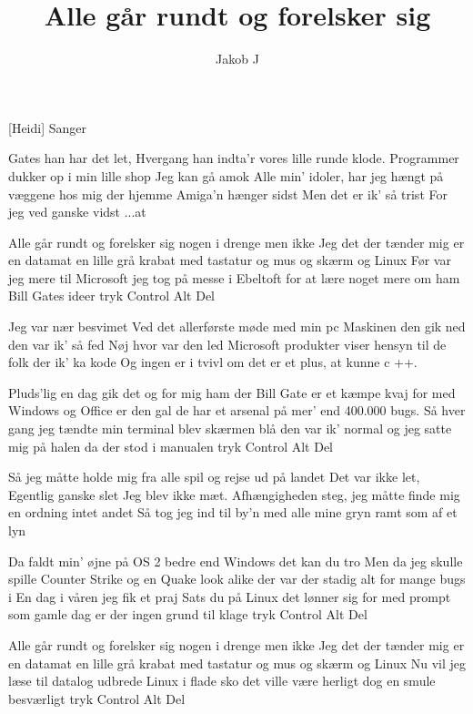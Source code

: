 \documentclass[a4paper,11pt]{article}
\title{Alle går rundt og forelsker sig}
\author{Jakob J}
\begin{document}
\maketitle

\begin{roles}
[Heidi] Sanger
\end{roles}

\begin{props}
\end{props}

\begin{song}
  
 Gates han har det let,
Hvergang han indta'r vores lille runde klode.
Programmer dukker op i min lille shop
Jeg kan gå amok
Alle min' idoler, har jeg hængt på væggene hos mig der hjemme
Amiga'n hænger sidst
Men det er ik' så trist
For jeg ved ganske vidst  ...at

Alle går rundt og forelsker sig
nogen i drenge men ikke Jeg
det der tænder mig er en datamat
en lille grå krabat
med tastatur og mus og skærm og Linux
Før var jeg mere til Microsoft
jeg tog på messe i Ebeltoft
for at lære noget mere
om ham Bill Gates ideer
tryk Control Alt Del

Jeg var nær besvimet
Ved det allerførste møde med min pc
Maskinen den gik ned
den var ik' så fed
Nøj hvor var den led
Microsoft produkter viser hensyn til de folk der ik' ka kode
Og ingen er i tvivl
om det er et plus,
at kunne c ++.

Pluds'lig en dag gik det og for mig
ham der Bill Gate er et kæmpe kvaj
for med Windows og Office er den gal
de har et arsenal
på mer' end 400.000 bugs. Så
hver gang jeg tændte min terminal
blev skærmen blå den var ik' normal
og jeg satte mig på halen
da der stod i manualen
tryk Control Alt Del

Så jeg måtte holde mig fra alle spil og rejse ud på landet
Det var ikke let,
Egentlig ganske slet
Jeg blev ikke mæt.
Afhængigheden steg, jeg måtte finde mig en ordning intet andet
Så tog jeg ind til by'n
med alle mine gryn
ramt som af et lyn

Da faldt min' øjne på OS 2
bedre end Windows det kan du tro
Men da jeg skulle spille Counter Strike
og en Quake look alike
der var der stadig alt for mange bugs i
En dag i våren jeg fik et praj
Sats du på Linux det lønner sig
for med prompt som gamle dag
er der ingen grund til klage
tryk Control Alt Del

Alle går rundt og forelsker sig
nogen i drenge men ikke Jeg
det der tænder mig er en datamat
en lille grå krabat
med tastatur og mus og skærm og Linux
Nu vil jeg læse til datalog
udbrede Linux i flade sko
det ville være herligt
dog en smule besværligt
tryk Control Alt Del


\end{song}
\end{document}
